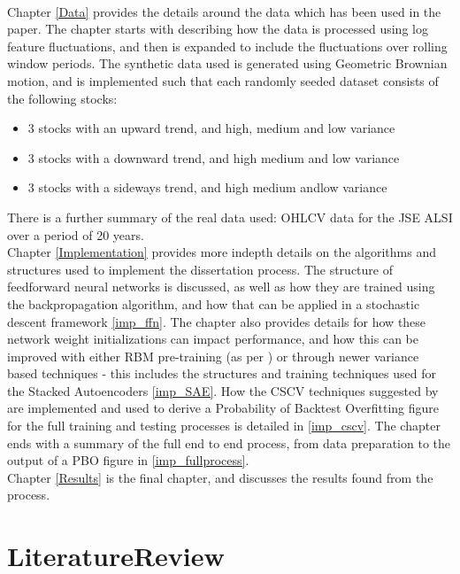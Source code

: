 \documentclass[a4paper,latin]{paper}
\begin{document}
~\\\newline
Chapter \ref{Data} provides the details around the data which has been used in the paper. The chapter starts with describing how the data is processed using log feature fluctuations, and then is expanded to include the fluctuations over rolling window periods. The synthetic data used is generated using Geometric Brownian motion, and is implemented such that each randomly seeded dataset consists of the following stocks:
\begin{itemize}
	\item 3 stocks with an upward trend, and high, medium and low variance
	\item 3 stocks with a downward trend, and high medium and low variance
	\item 3 stocks with a sideways trend, and high medium andlow variance
\end{itemize}
There is a further summary of the real data used: OHLCV data for the JSE ALSI over a period of 20  years.
~\\\newline
Chapter \ref{Implementation} provides more indepth details on the algorithms and structures used to implement the dissertation process. The structure of feedforward neural networks is discussed, as well as how they are trained using the backpropagation algorithm, and how that can be applied in a stochastic descent framework \ref{imp_ffn}. The chapter also provides details for how these network weight initializations can impact performance, and how this can be improved with either RBM pre-training (as per \cite{Hinton2}) or through newer variance based techniques  - this includes the structures and training techniques used for the Stacked Autoencoders \ref{imp_SAE}. How the CSCV techniques suggested by \cite{BailyPBO} are implemented and used to derive a Probability of Backtest Overfitting figure for the full training and testing processes is detailed in \ref{imp_cscv}. The chapter ends with a summary of the full end to end process, from data preparation to the output of a PBO figure in \ref{imp_fullprocess}.
~\\\newline
Chapter \ref{Results} is the final chapter, and discusses the results found from the process. 
\newpage
\section{LiteratureReview}\label{lr_LiteratureReview}
\end{document}

